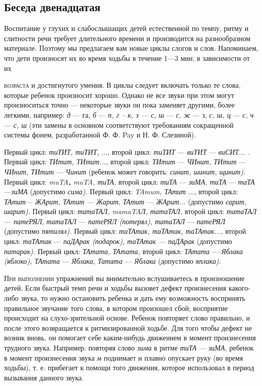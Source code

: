 \documentclass[a5paper]{book}
\renewcommand{\emph}[1]{\textit{#1}}
\begin{document}
\subsection*{Беседа двенадцатая}

Воспитание у глухих и слабослышащих детей естественной по темпу, ритму и
слитности речи требует длительного времени и производится на
разнообразном материале. Поэтому мы предлагаем вам новые циклы слогов и
слов. Напоминаем, что дети произносят их во время ходьбы в течение 1---3
мин, в зависимости от их

\textsc{возраста} и достигнутого умения. В циклы следует включать только
те слова, которые ребенок произносит хорошо. Однако не все звуки при
этом могут произноситься точно --- некоторые звуки он пока заменяет
другими, более легкими, например: \emph{д} --- га, \emph{б} --- \emph{п,
г -- к, з --- с, ш} --- \emph{с, ж} --- з, \emph{с, ш, ц} --- \emph{с,
ч} --- \emph{с, ш} (эти замены в основном соответствуют требованиям
сокращенной системы фонем, разработанной Ф. Ф. Pay и Н. Ф. Слезиной).

Первый цикл: \emph{тиТИТ, тиТИТ,} ..., второй цикл: \emph{тиТИТ} ---
\emph{виТИТ} --- \emph{виСИТ... .} Первый цикл: \emph{ТИтит, ТИтит...,}
второй цикл: \emph{ТИтит} --- \emph{ЧИнит, ТИтит} --- \emph{ЧИнит,
ТИтит} --- \emph{Чинит} (ребенок может говорить: \emph{синит, шинит,
щинит).} Первый цикл: \emph{muTA\textbf{,} muTA, тиТА,} второй цикл:
\emph{тиТА} --- \emph{зиМА, тиТА} --- \emph{таТА}---\emph{зиМА}
(допустимо \emph{сима).} Первый цикл: \emph{TAmum, ТАтит} ..., второй
цикл: \emph{ТАтит}--- \emph{ЖАрит, ТАтит} --- \emph{Жарит}, \emph{ТАтит}
--- \emph{ЖАрит...} (допустимо \emph{сарит, шарит).} Первый цикл:
\emph{татаТАЛ, mamaTAЛ, татаТАЛ,} второй цикл: \emph{татаТАЛ} ---
\emph{патеРЯЛ}, \emph{татаТАЛ} --- \emph{патеРЯЛ (потерял), татаТАЛ} ---
\emph{патеРЯЛ} (допустимо \emph{пятилял).} Первый цикл: \emph{таТАтак,
таТАтак, таТАтак...,} второй цикл: \emph{таТАтак} --- \emph{паДАрак
(подарок), таТАтак --- паДАрак} (допустимо \emph{патарак).} Первый цикл:
\emph{ТАтата, ТАтата,} второй цикл: \emph{ТАтата} --- \emph{Яблака
(яблоко), ТАтата} --- \emph{Яблака, Татата} --- \emph{Яблака} (допустимо
\emph{яплака).}

\textsc{При выполнении} упражнений вы внимательно вслушиваетесь в
произношение детей. Если быстрый темп речи и ходьбы вызовет дефект
произнесения какого-либо звука, то нужно остановить ребенка и дать ему
возможность воспринять правильное звучание того слова, в котором
произошел сбой; восприятие происходит на слухо-зрительной основе.
Ребенок повторяет слово правильно, и после этого возвращается к
ритмизированной ходьбе. Для того чтобы дефект не возник вновь, он
помогает себе каким-нибудь движением в момент произнесения трудного
звука. Например: повторяя слово \emph{зима} в ритме \emph{тиТА} ---
\emph{зиМА,} ребенок в момент произнесения звука \emph{м} поднимает и
плавно опускает руку (во время ходьбы), т. е. прибегает к помощи того
движения, которое использовал в период вызывания данного звука.
\end{document}
